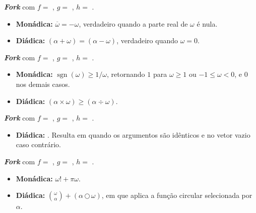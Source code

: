 {\begin{Qlist}
    \begin{solution}
    \textbf{\textit{Fork}} com $f=$ , $g=$ , $h=$ .
    \begin{itemize}
        \item \textbf{Monádica:} $\overline{\omega}=-\omega$, verdadeiro quando a parte real de $\omega$ é nula.
        \item \textbf{Diádica:} $(\alpha+\omega)=(\alpha-\omega)$, verdadeiro quando $\omega=0$.
    \end{itemize}
    \end{solution}

    \item[(f)] 

    \begin{solution}
    \textbf{\textit{Fork}} com $f=$ , $g=$ , $h=$ .
    \begin{itemize}
        \item \textbf{Monádica:} $\operatorname{sgn}(\omega)\geq 1/\omega$, retornando $1$ para $\omega\geq 1$ ou $-1\leq\omega<0$, e $0$ nos demais casos.
        \item \textbf{Diádica:} $(\alpha\times\omega)\geq(\alpha\div\omega)$.
    \end{itemize}
    \end{solution}

    \item[(g)] 

    \begin{solution}
    \textbf{\textit{Fork}} com $f=$ , $g=$ , $h=$ .
    \begin{itemize}
        \item \textbf{Diádica:} . Resulta em  quando os argumentos são idênticos e no vetor vazio caso contrário.
    \end{itemize}
    \end{solution}

    \item[(h)] 

    \begin{solution}
    \textbf{\textit{Fork}} com $f=$ , $g=$ , $h=$ .
    \begin{itemize}
        \item \textbf{Monádica:} $\omega!+\pi\omega$.
        \item \textbf{Diádica:} $\binom{\omega}{\alpha}+(\alpha\,\texttt{○}\,\omega)$, em que  aplica a função circular selecionada por $\alpha$.
    \end{itemize}
    \end{solution}


\end{Qlist}}
